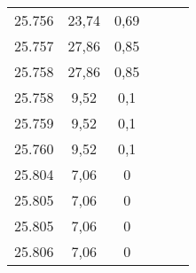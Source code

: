 \begin{tabularx}{9.5cm}{@{}ccc|ccc@{}}
25.756 & 23,74 & 0,69 &  &  & \\
25.757 & 27,86 & 0,85 &  &  & \\
25.758 & 27,86 & 0,85 &  &  & \\
25.758 & 9,52 & 0,1 &  &  & \\
25.759 & 9,52 & 0,1 &  &  & \\
25.760 & 9,52 & 0,1 &  &  & \\
25.804 & 7,06 & 0 &  &  & \\
25.805 & 7,06 & 0 &  &  & \\
25.805 & 7,06 & 0 &  &  & \\
25.806 & 7,06 & 0 &  &  & \\
  \bottomrule
\end{tabularx} 
